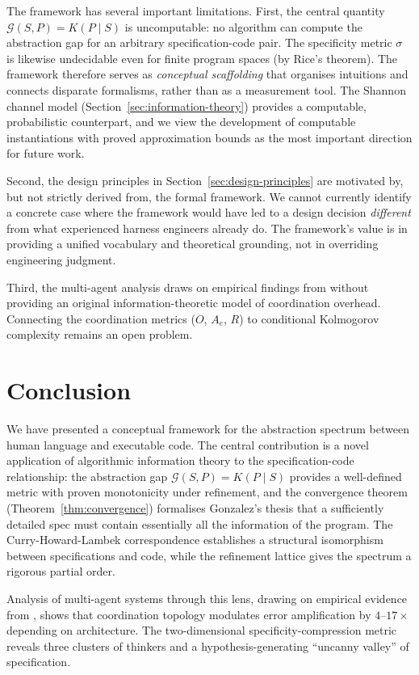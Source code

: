 \documentclass[11pt, a4paper, logo, copyright]{googledeepmind}
\begin{document}
The framework has several important limitations. First, the central quantity $\mathcal{G}(S, P) = K(P \mid S)$ is uncomputable: no algorithm can compute the abstraction gap for an arbitrary specification-code pair. The specificity metric $\sigma$ is likewise undecidable even for finite program spaces (by Rice's theorem). The framework therefore serves as \emph{conceptual scaffolding} that organises intuitions and connects disparate formalisms, rather than as a measurement tool. The Shannon channel model (Section~\ref{sec:information-theory}) provides a computable, probabilistic counterpart, and we view the development of computable instantiations with proved approximation bounds as the most important direction for future work.

Second, the design principles in Section~\ref{sec:design-principles} are motivated by, but not strictly derived from, the formal framework. We cannot currently identify a concrete case where the framework would have led to a design decision \emph{different} from what experienced harness engineers already do. The framework's value is in providing a unified vocabulary and theoretical grounding, not in overriding engineering judgment.

Third, the multi-agent analysis draws on empirical findings from \citet{kim2025scaling} without providing an original information-theoretic model of coordination overhead. Connecting the coordination metrics ($O$, $A_e$, $R$) to conditional Kolmogorov complexity remains an open problem.


\section{Conclusion}

We have presented a conceptual framework for the abstraction spectrum between human language and executable code. The central contribution is a novel application of algorithmic information theory to the specification-code relationship: the abstraction gap $\mathcal{G}(S, P) = K(P \mid S)$ provides a well-defined metric with proven monotonicity under refinement, and the convergence theorem (Theorem~\ref{thm:convergence}) formalises Gonzalez's thesis that a sufficiently detailed spec must contain essentially all the information of the program. The Curry-Howard-Lambek correspondence establishes a structural isomorphism between specifications and code, while the refinement lattice gives the spectrum a rigorous partial order.

Analysis of multi-agent systems through this lens, drawing on empirical evidence from \citet{kim2025scaling}, shows that coordination topology modulates error amplification by $4$--$17\times$ depending on architecture. The two-dimensional specificity-compression metric reveals three clusters of thinkers and a hypothesis-generating ``uncanny valley'' of specification.
\end{document}
